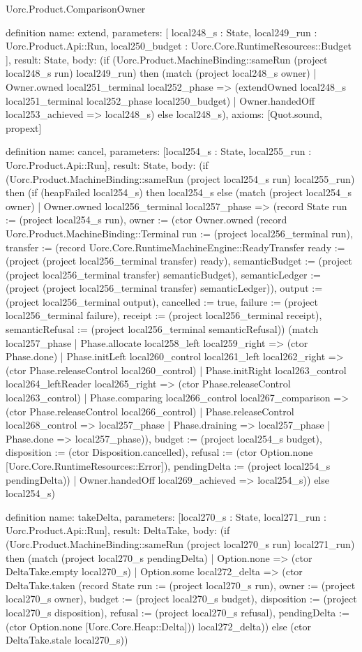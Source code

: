 \begin{lexlean}{Uorc.Product.ComparisonOwner}
\begin{semanticmodule}
definition{
  name: extend,
  parameters: [
    local248_s : State,
    local249_run : Uorc.Product.Api::Run,
    local250_budget : Uorc.Core.RuntimeResources::Budget
  ],
  result: State,
  body: (if (Uorc.Product.MachineBinding::sameRun (project local248_s run) local249_run) then (match (project local248_s owner)
    | Owner.owned local251_terminal local252_phase => (extendOwned local248_s local251_terminal local252_phase local250_budget)
    | Owner.handedOff local253_achieved => local248_s) else local248_s),
  axioms: [Quot.sound, propext]
}

definition{
  name: cancel,
  parameters: [local254_s : State, local255_run : Uorc.Product.Api::Run],
  result: State,
  body: (if (Uorc.Product.MachineBinding::sameRun (project local254_s run) local255_run) then (if (heapFailed local254_s) then local254_s else (match (project local254_s owner)
    | Owner.owned local256_terminal local257_phase => (record State {run := (project local254_s run), owner := (ctor Owner.owned (record Uorc.Product.MachineBinding::Terminal {run := (project local256_terminal run), transfer := (record Uorc.Core.RuntimeMachineEngine::ReadyTransfer {ready := (project (project local256_terminal transfer) ready), semanticBudget := (project (project local256_terminal transfer) semanticBudget), semanticLedger := (project (project local256_terminal transfer) semanticLedger)}), output := (project local256_terminal output), cancelled := true, failure := (project local256_terminal failure), receipt := (project local256_terminal receipt), semanticRefusal := (project local256_terminal semanticRefusal)}) (match local257_phase
      | Phase.allocate local258_left local259_right => (ctor Phase.done)
      | Phase.initLeft local260_control local261_left local262_right => (ctor Phase.releaseControl local260_control)
      | Phase.initRight local263_control local264_leftReader local265_right => (ctor Phase.releaseControl local263_control)
      | Phase.comparing local266_control local267_comparison => (ctor Phase.releaseControl local266_control)
      | Phase.releaseControl local268_control => local257_phase
      | Phase.draining => local257_phase
      | Phase.done => local257_phase)), budget := (project local254_s budget), disposition := (ctor Disposition.cancelled), refusal := (ctor Option.none [Uorc.Core.RuntimeResources::Error]), pendingDelta := (project local254_s pendingDelta)})
    | Owner.handedOff local269_achieved => local254_s)) else local254_s)
}

definition{
  name: takeDelta,
  parameters: [local270_s : State, local271_run : Uorc.Product.Api::Run],
  result: DeltaTake,
  body: (if (Uorc.Product.MachineBinding::sameRun (project local270_s run) local271_run) then (match (project local270_s pendingDelta)
    | Option.none => (ctor DeltaTake.empty local270_s)
    | Option.some local272_delta => (ctor DeltaTake.taken (record State {run := (project local270_s run), owner := (project local270_s owner), budget := (project local270_s budget), disposition := (project local270_s disposition), refusal := (project local270_s refusal), pendingDelta := (ctor Option.none [Uorc.Core.Heap::Delta])}) local272_delta)) else (ctor DeltaTake.stale local270_s))
}


\end{semanticmodule}
\end{lexlean}
